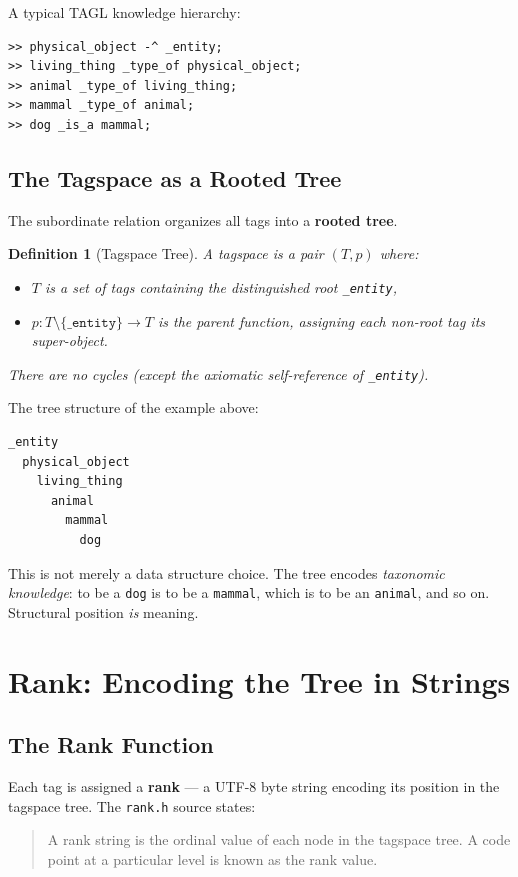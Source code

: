 \documentclass{article}
\newtheorem{definition}{Definition}[section]
\begin{document}
A typical TAGL knowledge hierarchy:
\begin{lstlisting}[style=tagl, caption={Building a subordinate hierarchy in TAGL}]
>> physical_object -^ _entity;
>> living_thing _type_of physical_object;
>> animal _type_of living_thing;
>> mammal _type_of animal;
>> dog _is_a mammal;
\end{lstlisting}

\subsection{The Tagspace as a Rooted Tree}

The subordinate relation organizes all tags into a \textbf{rooted tree}.

\begin{definition}[Tagspace Tree]
A tagspace is a pair $(T, p)$ where:
\begin{itemize}
  \item $T$ is a set of tags containing the distinguished root
        \texttt{\_entity},
  \item $p : T \setminus \{\texttt{\_entity}\} \to T$ is the \emph{parent
        function}, assigning each non-root tag its super-object.
\end{itemize}
There are no cycles (except the axiomatic self-reference of
\texttt{\_entity}).
\end{definition}

The tree structure of the example above:
\begin{verbatim}
_entity
  physical_object
    living_thing
      animal
        mammal
          dog
\end{verbatim}

This is not merely a data structure choice. The tree encodes \emph{taxonomic
knowledge}: to be a \texttt{dog} is to be a \texttt{mammal}, which is to be an
\texttt{animal}, and so on. Structural position \emph{is} meaning.

\section{Rank: Encoding the Tree in Strings}

\subsection{The Rank Function}

Each tag is assigned a \textbf{rank} --- a UTF-8 byte string encoding its
position in the tagspace tree. The \texttt{rank.h} source states:
\begin{quote}
A rank string is the ordinal value of each node in the tagspace tree. A code
point at a particular level is known as the rank value.
\end{quote}
\end{document}

